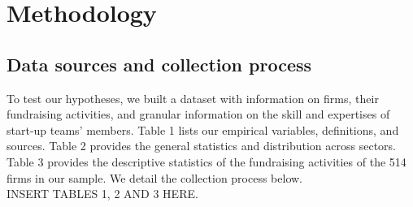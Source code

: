 \documentclass[12pt]{article}
\begin{document}
\section{Methodology}

\subsection{Data sources and collection process}

To test our hypotheses, we built a dataset with information on firms, their fundraising activities, and granular information on the skill and expertises of start-up teams' members. Table 1\label{table1} lists our empirical variables, definitions, and sources. Table 2\label{table2} provides the general statistics and distribution across sectors. Table 3\label{table3} provides the descriptive statistics of the fundraising activities of the 514 firms in our sample. We detail the collection process below. \\

INSERT TABLES 1, 2 AND 3 HERE. \\
\end{document}
